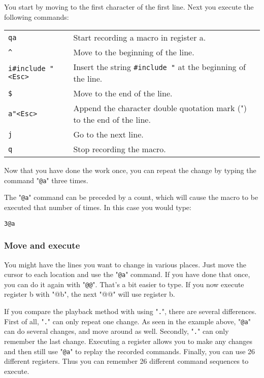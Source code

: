 You start by moving to the first character of the first line.
Next you execute the following commands:

\begin{center}\begin{tabular}{l l}
				\texttt{qa} & Start recording a macro in register a.\\
				\texttt{\^{}} & Move to the beginning of the line.\\
				\texttt{i\#include "<Esc>} & Insert the string \texttt{\#include "} at the beginning of the line.\\
				\texttt{\$} & Move to the end of the line.\\
				\texttt{a"<Esc>} & Append the character double quotation mark (") to the end of the line.\\
				\texttt{j} & Go to the next line.\\
				\texttt{q} & Stop recording the macro.\\
\end{tabular}\end{center}

Now that you have done the work once, you can repeat the change by typing the command "\texttt{@a}" three times.

The "\texttt{@a}" command can be preceded by a count, which will cause the macro to be executed that number of times.
In this case you would type:

\begin{Verbatim}[samepage=true]
 3@a
\end{Verbatim}

\subsubsection{Move and execute}
You might have the lines you want to change in various places.
Just move the cursor to each location and use the "\texttt{@a}" command.
If you have done that once, you can do it again with "\texttt{@@}".
That's a bit easier to type.
If you now execute register b with "@b", the next "@@" will use register b.

If you compare the playback method with using "\texttt{.}", there are several differences.
First of all, "\texttt{.}" can only repeat one change.
As seen in the example above, "\texttt{@a}" can do several changes, and move around as well.
Secondly, "\texttt{.}" can only remember the last change.
Executing a register allows you to make any changes and then still use "\texttt{@a}" to replay the recorded commands.
Finally, you can use 26 different registers.
Thus you can remember 26 different command sequences to execute.


